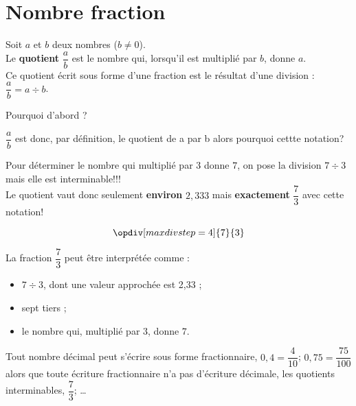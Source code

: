 \section{Nombre fraction}
\begin{definition}
   Soit $a$ et $b$ deux nombres ($b\neq0$).\\
   Le {\bf quotient} $\dfrac{a}{b}$ est le nombre qui, lorsqu'il est multiplié par $b$, donne $a$. \\
   Ce quotient écrit sous forme d'une fraction est le résultat d'une division : $\dfrac{a}{b} =a\div b$.
\end{definition}

\begin{myBox}{ Pourquoi d'abord ?}
   \begin{minipage}{0.6\linewidth}
   $\dfrac{a}{b}$ est donc, par définition, le quotient de a par b alors pourquoi cettte notation?\par\vspace{0.25cm}
   Pour déterminer le nombre qui multiplié par $3$ donne $7$, on pose la division $7\div 3$ mais elle est interminable!!!\\
   Le quotient vaut donc seulement \textbf{environ} $2,333$ mais \textbf{exactement} $\dfrac73$ avec cette notation!
   \end{minipage}
   \begin{minipage}{0.3\linewidth}
      $$\opdiv[maxdivstep=4]{7}{3}$$
   \end{minipage}   
\end{myBox}

\begin{exemple*1}
   La fraction $\dfrac73$ peut être interprétée comme :   
   \begin{itemize}
      \item $7\div3$, dont une valeur approchée est 2,33 ;
      \item sept tiers ;
      \item le nombre qui, multiplié par $3$, donne $7$.
   \end{itemize}
\end{exemple*1}

\begin{remarque}
   Tout nombre décimal peut s'écrire sous forme fractionnaire, $0,4=\dfrac{4}{10}$; $0,75=\dfrac{75}{100}$ alors que toute écriture fractionnaire n'a pas d'écriture décimale, les quotients interminables, $\dfrac{7}{3}$; \dots
\end{remarque}

